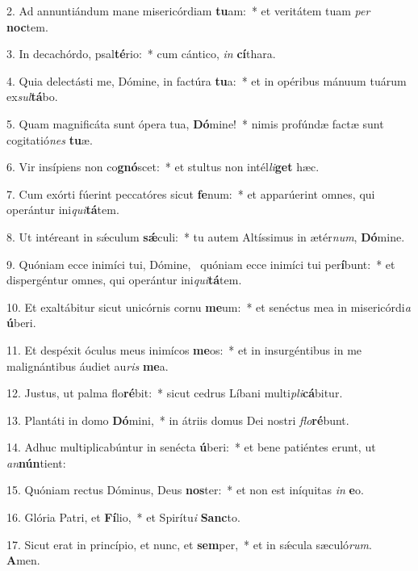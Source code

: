 2. Ad annuntiándum mane misericórdiam \textbf{tu}am:~*  et veritátem tuam \textit{per} \textbf{noc}tem.\

3. In decachórdo, psal\textbf{té}rio:~*  cum cántico, \textit{in} \textbf{cí}thara.\

4. Quia delectásti me, Dómine, in factúra \textbf{tu}a:~*  et in opéribus mánuum tuárum ex\textit{sul}\textbf{tá}bo.\

5. Quam magnificáta sunt ópera tua, \textbf{Dó}mine!~*  nimis profúndæ factæ sunt cogitatió\textit{nes} \textbf{tu}æ.\

6. Vir insípiens non co\textbf{gnó}scet:~*  et stultus non intél\textit{li}\textbf{get} hæc.\

7. Cum exórti fúerint peccatóres sicut \textbf{fe}num:~*  et apparúerint omnes, qui operántur ini\textit{qui}\textbf{tá}tem.\

8. Ut intéreant in sǽculum \textbf{sǽ}culi:~*  tu autem Altíssimus in ætér\textit{num}, \textbf{Dó}mine.\

9. Quóniam ecce inimíci tui, Dómine, \dag\  quóniam ecce inimíci tui per\textbf{í}bunt:~*  et dispergéntur omnes, qui operántur ini\textit{qui}\textbf{tá}tem.\

10. Et exaltábitur sicut unicórnis cornu \textbf{me}um:~*  et senéctus mea in misericórdi\textit{a} \textbf{ú}beri.\

11. Et despéxit óculus meus inimícos \textbf{me}os:~*  et in insurgéntibus in me malignántibus áudiet au\textit{ris} \textbf{me}a.\

12. Justus, ut palma flo\textbf{ré}bit:~*  sicut cedrus Líbani multi\textit{pli}\textbf{cá}bitur.\

13. Plantáti in domo \textbf{Dó}mini,~*  in átriis domus Dei nostri \textit{flo}\textbf{ré}bunt.\

14. Adhuc multiplicabúntur in senécta \textbf{ú}beri:~*  et bene patiéntes erunt, ut \textit{an}\textbf{nún}tient:\

15. Quóniam rectus Dóminus, Deus \textbf{nos}ter:~*  et non est iníquitas \textit{in} \textbf{e}o.\

16. Glória Patri, et \textbf{Fí}lio,~*  et Spirítu\textit{i} \textbf{Sanc}to.\

17. Sicut erat in princípio, et nunc, et \textbf{sem}per,~*  et in sǽcula sæculó\textit{rum}. \textbf{A}men.\

